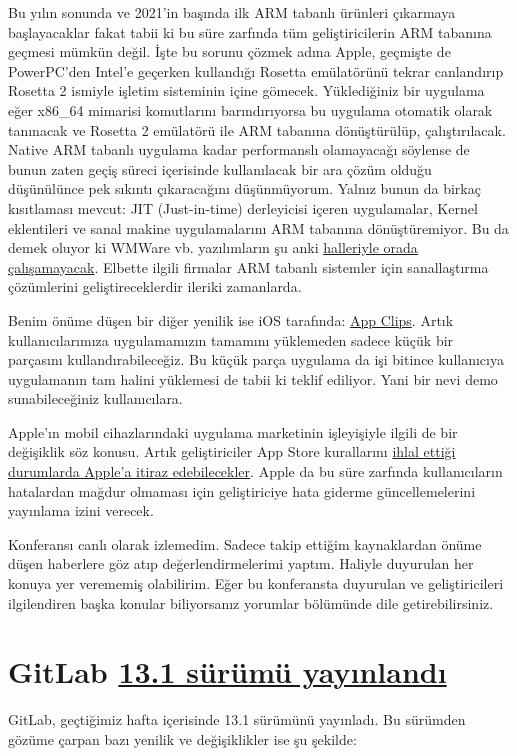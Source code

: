 \documentclass[11pt]{article}
\begin{document}
Bu yılın sonunda ve 2021'in başında ilk ARM tabanlı ürünleri çıkarmaya
başlayacaklar fakat tabii ki bu süre zarfında tüm geliştiricilerin ARM
tabanına geçmesi mümkün değil. İşte bu sorunu çözmek adına Apple, geçmişte de
PowerPC'den Intel'e geçerken kullandığı Rosetta emülatörünü tekrar canlandırıp
Rosetta 2 ismiyle işletim sisteminin içine gömecek. Yüklediğiniz bir uygulama
eğer x86\_64 mimarisi komutlarını barındırıyorsa bu uygulama otomatik olarak
tanınacak ve Rosetta 2 emülatörü ile ARM tabanına dönüştürülüp,
çalıştırılacak. Native ARM tabanlı uygulama kadar performanslı olamayacağı
söylense de bunun zaten geçiş süreci içerisinde kullanılacak bir ara çözüm
olduğu düşünülünce pek sıkıntı çıkaracağını düşünmüyorum. Yalnız bunun da
birkaç kısıtlaması mevcut: JIT (Just-in-time) derleyicisi içeren uygulamalar,
Kernel eklentileri ve sanal makine uygulamalarını ARM tabanına dönüştüremiyor.
Bu da demek oluyor ki WMWare vb. yazılımların şu anki \href{https://www.macrumors.com/2020/06/23/rosetta-wont-support-x86-virtualization-windows/}{halleriyle orada
çalışamayacak}. Elbette ilgili firmalar ARM tabanlı sistemler için
sanallaştırma çözümlerini geliştireceklerdir ileriki zamanlarda.

Benim önüme düşen bir diğer yenilik ise iOS tarafında: \href{https://developer.apple.com/app-clips/}{App Clips}. Artık
kullanıcılarımıza uygulamamızın tamamını yüklemeden sadece küçük bir parçasını
kullandırabileceğiz. Bu küçük parça uygulama da işi bitince kullanıcıya
uygulamanın tam halini yüklemesi de tabii ki teklif ediliyor. Yani bir nevi
demo sunabileceğiniz kullanıcılara.

Apple'ın mobil cihazlarındaki uygulama marketinin işleyişiyle ilgili de bir
değişiklik söz konusu. Artık geliştiriciler App Store kurallarını \href{https://www.theverge.com/2020/6/22/21299814/apple-app-store-policies-ios-bug-fixes-approval-dispute-appeal}{ihlal ettiği
durumlarda Apple'a itiraz edebilecekler}. Apple da bu süre zarfında
kullanıcıların hatalardan mağdur olmaması için geliştiriciye hata giderme
güncellemelerini yayınlama izini verecek.

Konferansı canlı olarak izlemedim. Sadece takip ettiğim kaynaklardan önüme
düşen haberlere göz atıp değerlendirmelerimi yaptım. Haliyle duyurulan her
konuya yer verememiş olabilirim. Eğer bu konferansta duyurulan ve
geliştiricileri ilgilendiren başka konular biliyorsanız yorumlar bölümünde
dile getirebilirsiniz.
\section{GitLab \href{https://about.gitlab.com/releases/2020/06/22/gitlab-13-1-released/}{13.1 sürümü yayınlandı}}
\label{sec:org0b15588}
GitLab, geçtiğimiz hafta içerisinde 13.1 sürümünü yayınladı. Bu sürümden
gözüme çarpan bazı yenilik ve değişiklikler ise şu şekilde:
\end{document}
